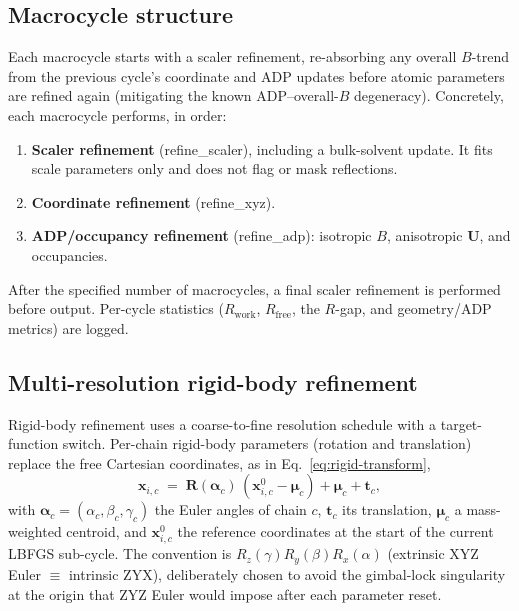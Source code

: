 \documentclass{iucrjournals}
\begin{document}
\subsection{Macrocycle structure}

Each macrocycle starts with a scaler refinement, re-absorbing any overall
$B$-trend from the previous cycle's coordinate and ADP updates before atomic
parameters are refined again (mitigating the known ADP--overall-$B$
degeneracy).  Concretely, each macrocycle performs, in order:
%
\begin{enumerate}
  \item \textbf{Scaler refinement} (refine\_scaler), including a bulk-solvent
    update. It fits scale parameters only and does not flag or mask reflections.
  \item \textbf{Coordinate refinement} (refine\_xyz).
  \item \textbf{ADP/occupancy refinement} (refine\_adp): isotropic $B$,
    anisotropic $\mathbf{U}$, and occupancies.
\end{enumerate}
%
After the specified number of macrocycles, a final scaler refinement is
performed before output.
Per-cycle statistics ($R_\mathrm{work}$, $R_\mathrm{free}$, the $R$-gap, and
geometry/ADP metrics) are logged.

\subsection{Multi-resolution rigid-body refinement}\label{sec:rigid-body}

Rigid-body refinement uses a coarse-to-fine resolution schedule with a
target-function switch.  Per-chain rigid-body parameters (rotation and
translation) replace the free Cartesian coordinates, as in
Eq.~\ref{eq:rigid-transform},
%
\begin{equation}
  \mathbf{x}_{i,c} \;=\; \mathbf{R}(\boldsymbol{\alpha}_{c})\,
                       (\mathbf{x}_{i,c}^{0} - \boldsymbol{\mu}_{c})
                       + \boldsymbol{\mu}_{c} + \mathbf{t}_{c},
  \label{eq:rigid-transform}
\end{equation}
%
with $\boldsymbol{\alpha}_{c} = (\alpha_{c}, \beta_{c}, \gamma_{c})$ the
Euler angles of chain $c$, $\mathbf{t}_{c}$ its translation,
$\boldsymbol{\mu}_{c}$ a mass-weighted centroid, and
$\mathbf{x}_{i,c}^{0}$ the reference coordinates at the start of the
current LBFGS sub-cycle.  The convention is
$R_{z}(\gamma)R_{y}(\beta)R_{x}(\alpha)$ (extrinsic XYZ Euler $\equiv$
intrinsic ZYX), deliberately chosen to avoid the gimbal-lock singularity at
the origin that ZYZ Euler would impose after each parameter reset.
\end{document}
